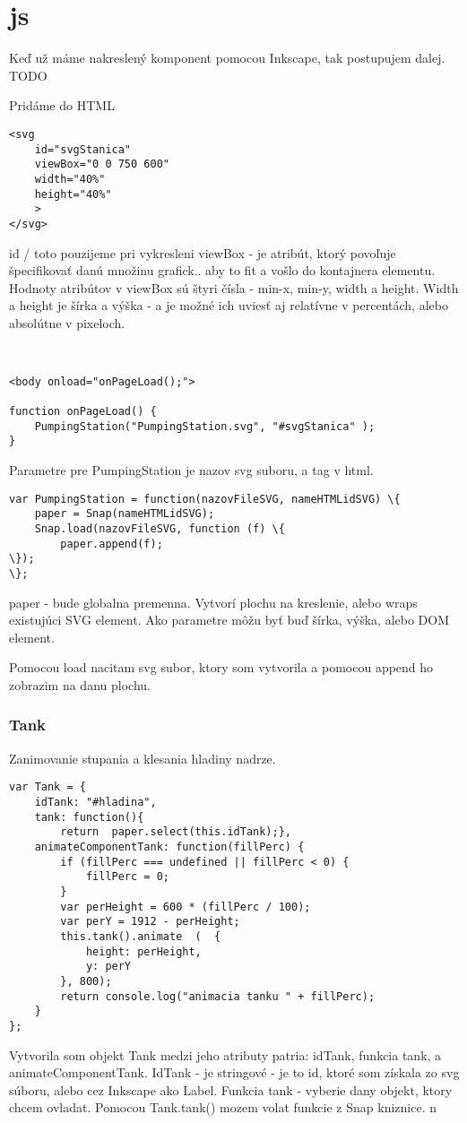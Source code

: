 \chapter{js}

Keď už máme nakreslený komponent pomocou Inkscape, tak postupujem dalej. TODO

Pridáme do HTML  
\begin{lstlisting}
<svg  
	id="svgStanica"  
	viewBox="0 0 750 600" 
	width="40%" 
	height="40%" 
	>
</svg>
\end{lstlisting}


id / toto pouzijeme pri vykresleni 
viewBox - je atribút, ktorý povoľuje špecifikovať danú množinu grafick.. aby to fit a vošlo do kontajnera elementu. Hodnoty atribútov v viewBox sú štyri čísla - min-x, min-y, width a height. 
Width a height je šírka a výška - a je možné ich uviesť aj relatívne v percentách, alebo absolútne v pixeloch. 

\begin{lstlisting}


<body onload="onPageLoad();">

function onPageLoad() {
	PumpingStation("PumpingStation.svg", "#svgStanica" );
}
\end{lstlisting}
Parametre pre PumpingStation je nazov svg suboru, a tag v html.
\begin{lstlisting}
var PumpingStation = function(nazovFileSVG, nameHTMLidSVG) \{
	paper = Snap(nameHTMLidSVG);
	Snap.load(nazovFileSVG, function (f) \{
		paper.append(f);
\});
\};
\end{lstlisting}
paper - bude globalna premenna. Vytvorí plochu na  kreslenie, alebo  wraps existujúci SVG element. Ako parametre môžu byť buď šírka, výška, alebo DOM element. 

Pomocou load nacitam svg subor, ktory som vytvorila a pomocou append ho zobrazim na danu plochu. 

\subsection{Tank}
Zanimovanie stupania a klesania hladiny nadrze. 
\begin{lstlisting}
var Tank = {
	idTank: "#hladina",
	tank: function(){
		return  paper.select(this.idTank);},
	animateComponentTank: function(fillPerc) {
		if (fillPerc === undefined || fillPerc < 0) {
			fillPerc = 0;
		}
		var perHeight = 600 * (fillPerc / 100);
		var perY = 1912 - perHeight;
		this.tank().animate  (	{
			height: perHeight,
			y: perY
		}, 800);
		return console.log("animacia tanku " + fillPerc);
	}
};
\end{lstlisting}
Vytvorila som objekt Tank medzi jeho atributy patria: idTank, funkcia tank, a animateComponentTank. IdTank - je stringové - je to id, ktoré som získala zo svg súboru, alebo cez Inkscape ako Label. Funkcia tank - vyberie dany objekt, ktory chcem ovladat. Pomocou Tank.tank() mozem volat funkcie z Snap kniznice. n 

